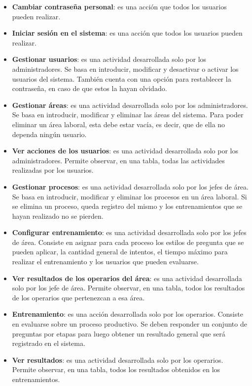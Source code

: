 \begin{itemize}
\item \textbf{Cambiar contraseña personal}: es una acción que todos los usuarios pueden realizar.
\item \textbf{Iniciar sesión en el sistema}: es una acción que todos los usuarios pueden realizar.

\item \textbf{Gestionar usuarios}: es una actividad desarrollada solo por los administradores. Se basa en introducir, modificar y desactivar o activar los usuarios del sistema. También cuenta con una opción para restablecer la contraseña, en caso de que estos la hayan olvidado.
\item \textbf{Gestionar áreas}: es una actividad desarrollada solo por los administradores. Se basa en introducir, modificar y eliminar las áreas del sistema. Para poder eliminar un área laboral, esta debe estar vacía, es decir, que de ella no dependa ningún usuario.
\item \textbf{Ver acciones de los usuarios}: es una actividad desarrollada solo por los administradores. Permite observar, en una tabla, todas las actividades realizadas por los usuarios.

\item \textbf{Gestionar procesos}: es una actividad desarrollada solo por los jefes de área. Se basa en introducir, modificar y eliminar los procesos en un área laboral. Si se elimina un proceso, queda registro del mismo y los entrenamientos que se hayan realizado no se pierden.
\item \textbf{Configurar entrenamiento}: es una actividad desarrollada solo por los jefes de área. Consiste en asignar para cada proceso los estilos de pregunta que se pueden aplicar, la cantidad general de intentos, el tiempo máximo para realizar el entrenamiento y los usuarios que pueden evaluarse.
\item \textbf{Ver resultados de los operarios del área}: es una actividad desarrollada solo por los jefe de área. Permite observar, en una tabla, todos los resultados de los operarios que pertenezcan a esa área.

\item \textbf{Entrenamiento}: es una acción desarrollada solo por los operarios. Consiste en evaluarse sobre un proceso productivo. Se deben responder un conjunto de preguntas por etapas para luego obtener un resultado general que será registrado en el sistema.
\item \textbf{Ver resultados}: es una actividad desarrollada solo por los operarios. Permite observar, en una tabla, todos los resultados obtenidos en los entrenamientos.
\end{itemize}

